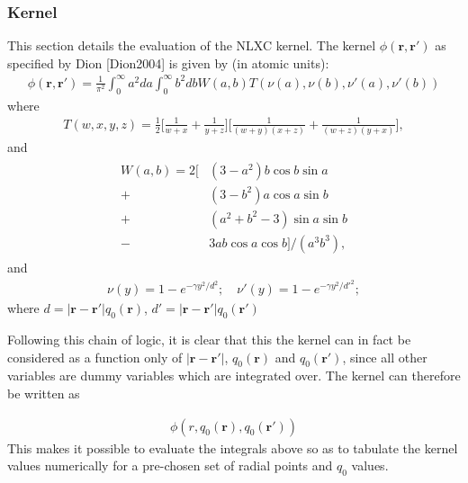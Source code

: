 \documentclass[letterpaper,10pt,english]{sphinxmanual}
\begin{document}
\subsubsection{Kernel}
\label{\detokenize{VDW-DF:kernel}}
This section details the evaluation of the NLXC kernel. The kernel
\(\phi({\mathbf{r}},{\mathbf{r}}')\) as specified by Dion 
{[}Dion2004{]} is given by (in atomic units):
\begin{equation*}
\begin{split}\phi({\mathbf{r}},{\mathbf{r}}') = \frac{1}{\pi^2}\int_{0}^{\infty}a^2da
    \int_0^{\infty}b^2db W(a,b) T(\nu(a),\nu(b),\nu'(a),\nu'(b))\end{split}
\end{equation*}
where
\begin{equation*}
\begin{split}T(w,x,y,z) = \frac{1}{2}\Big[\frac{1}{w+x} + \frac{1}{y+z}\Big]\Big[\frac{1}{(w+y)(x+z)}+\frac{1}{(w+z)(y+x)}\Big],\end{split}
\end{equation*}
and
\begin{equation*}
\begin{split}\begin{aligned}
    W(a,b) = 2\Big[ & (3-a^2)b\cos b \sin a \\
                    + & (3-b^2)a\cos a \sin b   \\
                    + & (a^2+b^2-3)\sin a\sin b \\
                    - & 3ab\cos a \cos b \Big]/(a^3b^3),\end{aligned}\end{split}
\end{equation*}
and
\begin{equation*}
\begin{split}\nu(y) = 1- e^{-\gamma y^2/d^2}; \quad \nu'(y) = 1- e^{-\gamma y^2/d'^2};\end{split}
\end{equation*}
where \(d=|{\mathbf{r}}-{\mathbf{r}}'|q_0({\mathbf{r}})\),
\(d'=|{\mathbf{r}}-{\mathbf{r}}'|q_0(\mathbf{r'})\)

Following this chain of logic, it is clear that this the kernel can in
fact be considered as a function only of
\(|{\mathbf{r}}-{\mathbf{r}}'|\), \(q_0({\mathbf{r}})\) and
\(q_0({\mathbf{r}}')\), since all other variables are dummy
variables which are integrated over. The kernel can therefore be written
as

\label{\detokenize{VDW-DF:equation-phi-tab}}\begin{equation}\label{equation:VDW-DF:phi_tab}
\begin{split}\phi(r,q_0({\mathbf{r}}),q_0({\mathbf{r}}'))\end{split}
\end{equation}
This makes it possible to evaluate the integrals above so as to
tabulate the kernel values numerically for a pre-chosen set of radial
points and \(q_0\) values.
\end{document}
